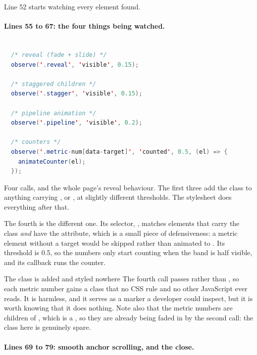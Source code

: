 Line 52 starts watching every element found.

\paragraph{Lines 55 to 67: the four things being watched.}

\begin{lstlisting}[language=Java,firstnumber=54,caption={\file{js/main.js}, lines 54--67}]

  /* reveal (fade + slide) */
  observe('.reveal', 'visible', 0.15);

  /* staggered children */
  observe('.stagger', 'visible', 0.15);

  /* pipeline animation */
  observe('.pipeline', 'visible', 0.2);

  /* counters */
  observe('.metric-num[data-target]', 'counted', 0.5, (el) => {
    animateCounter(el);
  });
\end{lstlisting}

Four calls, and the whole page's reveal behaviour. The first three add the class
 to anything carrying ,  or
, at slightly different thresholds. The stylesheet does everything
after that.

The fourth is the different one. Its selector,
, matches elements that carry the class \emph{and}
have the attribute, which is a small piece of defensiveness: a metric element
without a target would be skipped rather than animated to . Its
threshold is 0.5, so the numbers only start counting when the band is half visible,
and its callback runs the counter.

\begin{honest}{The class  is added and styled nowhere}
The fourth call passes  rather than , so each
metric number gains a class that no CSS rule and no other JavaScript ever reads. It
is harmless, and it serves as a marker a developer could inspect, but it is worth
knowing that it does nothing. Note also that the metric numbers are children of
, which is a , so they are already being faded
in by the second call: the class here is genuinely spare.
\end{honest}

\paragraph{Lines 69 to 79: smooth anchor scrolling, and the close.}

